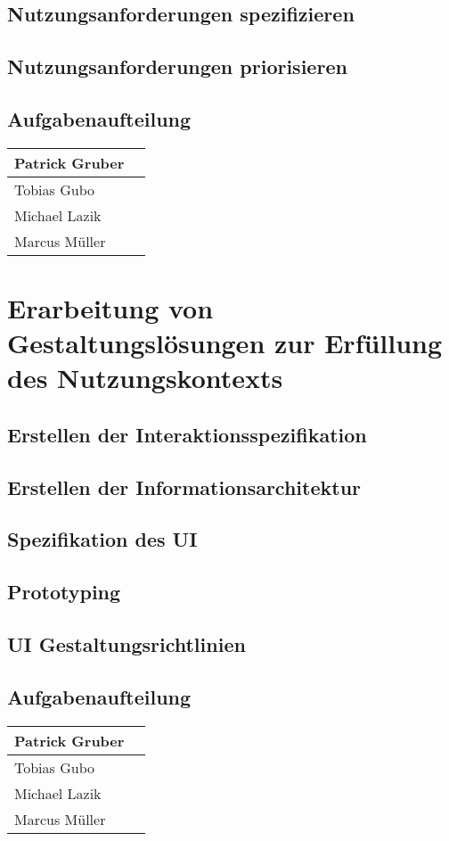 \documentclass[12pt, a4paper]{scrartcl}
\begin{document}
	\subsection{Nutzungsanforderungen spezifizieren}
	\blindtext[1]
	\subsection{Nutzungsanforderungen priorisieren}
	\blindtext[1]
	
	\subsection*{Aufgabenaufteilung}
	\begin{tabularx}{0.95\textwidth}{|l|X|}
		\hline
		Patrick Gruber & \\
		\hline
		Tobias Gubo & \\
		\hline
		Michael Lazik & \\
		\hline
		Marcus Müller & \\
		\hline
	\end{tabularx}
	
	\newpage
	
	\section{Erarbeitung von Gestaltungslösungen zur Erfüllung des Nutzungskontexts}
	\blindtext[2]
	\subsection{Erstellen der Interaktionsspezifikation}
	\blindtext[1]
	\subsection{Erstellen der Informationsarchitektur}
	\blindtext[1]
	\subsection{Spezifikation des UI}
	\blindtext[1]
	\subsection{Prototyping}
	\blindtext[1]
	\subsection{UI Gestaltungsrichtlinien}
	\blindtext[1]
	
	\subsection*{Aufgabenaufteilung}
	\begin{tabularx}{0.95\textwidth}{|l|X|}
		\hline
		Patrick Gruber & \\
		\hline
		Tobias Gubo & \\
		\hline
		Michael Lazik & \\
		\hline
		Marcus Müller & \\
		\hline
	\end{tabularx}
	
\end{document}
